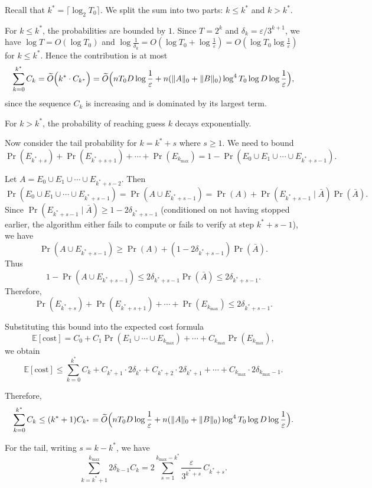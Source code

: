 \documentclass{article}
\numberwithin{equation}{section}
\begin{document}
Recall that $k^* = \lceil \log_2 T_0 \rceil$. We split the sum into two parts: $k \le k^*$ and $k > k^*$.

For $k \le k^*$, the probabilities are bounded by $1$. Since $T = 2^k$ and $\delta_k = \varepsilon / 3^{k+1}$, we have $\log T = O(\log T_0)$ and $\log\frac{1}{\delta_k}= O(\log T_0 + \log\frac{1}{\varepsilon}) = O(\log T_0 \log\frac{1}{\varepsilon})$ for $k \le k^*$. Hence the contribution is at most
\[
\sum_{k=0}^{k^*} C_k 
= \widetilde{O}\Bigl( k^* \cdot C_{k^*} \Bigr)
= \widetilde{O}\Bigl( 
n T_0 D \log\frac{1}{\varepsilon} 
+ n(\|A\|_0 + \|B\|_0) \log^4 T_0 \log D \log\frac{1}{\varepsilon}
\Bigr),
\]
since the sequence $C_k$ is increasing and is dominated by its largest term.

For $k > k^*$, the probability of reaching guess $k$ decays exponentially. 


Now consider the tail probability for $k = k^* + s$ where $s \ge 1$. We need to bound
\[
\Pr(E_{k^*+s}) + \Pr(E_{k^*+s+1}) + \cdots + \Pr(E_{k_{\max}})
= 1 - \Pr(E_0 \cup E_1 \cup \cdots \cup E_{k^*+s-1}).
\]

Let $A = E_0 \cup E_1 \cup \cdots \cup E_{k^*+s-2}$. Then
\[
\Pr(E_0 \cup E_1 \cup \cdots \cup E_{k^*+s-1})=\Pr(A \cup E_{k^*+s-1})
= \Pr(A) + \Pr(E_{k^*+s-1} \mid \bar{A}) \Pr(\bar{A}).
\]
Since $\Pr(E_{k^*+s-1} \mid \bar{A}) \ge 1 - 2\delta_{k^*+s-1}$ (conditioned on not having stopped earlier, the algorithm either fails to compute or fails to verify at step $k^*+s-1$), we have
\[
\Pr(A \cup E_{k^*+s-1})
\ge \Pr(A) + (1 - 2\delta_{k^*+s-1}) \Pr(\bar{A}).
\]
Thus
\[
1 - \Pr(A \cup E_{k^*+s-1})
\le 2\delta_{k^*+s-1} \Pr(\bar{A})
\le 2\delta_{k^*+s-1}.
\]
Therefore,
\[
\Pr(E_{k^*+s}) + \Pr(E_{k^*+s+1}) + \cdots + \Pr(E_{k_{\max}})
\le 2\delta_{k^*+s-1}.
\]

Substituting this bound into the expected cost formula
\[
\mathbb{E}[\text{cost}]
= C_0 + C_1 \Pr(E_1 \cup \cdots \cup E_{k_{\max}}) + \cdots + C_{k_{\max}} \Pr(E_{k_{\max}}),
\]
we obtain
\[
\mathbb{E}[\text{cost}]
\le \sum_{k=0}^{k^*} C_k
+ C_{k^*+1} \cdot 2\delta_{k^*}
+ C_{k^*+2} \cdot 2\delta_{k^*+1}
+ \cdots + C_{k_{\max}} \cdot 2\delta_{k_{\max}-1}.
\]


Therefore,
\[
\sum_{k=0}^{k^*} C_k \le (k^*+1) C_{k^*}
= \widetilde{O}\Bigl( 
n T_0 D \log\frac{1}{\varepsilon} 
+ n(\|A\|_0 + \|B\|_0) \log^4 T_0 \log D \log\frac{1}{\varepsilon}
\Bigr).
\]

For the tail, writing $s = k - k^*$, we have
\[
\sum_{k=k^*+1}^{k_{\max}} 2\delta_{k-1} C_k
= 2 \sum_{s=1}^{k_{\max}-k^*} \frac{\varepsilon}{3^{k^*+s}} \, C_{k^*+s}.
\]
\end{document}
